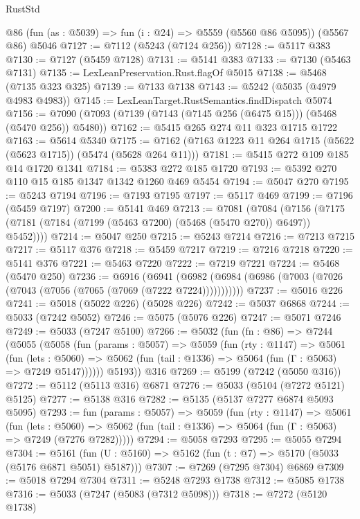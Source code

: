 \begin{lexlean}{RustStd}
\begin{coremodule}
{\begin{coremodule}
{{{{{{{{{{{{{{{{{{{{{{{{{{{{{{{{{{    @86
    (fun (as : @5039) => fun (i : @24) => @5559 (@5560 @86 @5095))
    (@5567 @86)
    @5046
@7127 := @7112 (@5243 (@7124 @256))
@7128 := @5117 @383
@7130 := @7127 (@5459 @7128)
@7131 := @5141 @383
@7133 := @7130 (@5463 @7131)
@7135 := LexLeanPreservation.Rust.flagOf @5015
@7138 := @5468 (@7135 @323 @325)
@7139 := @7133 @7138
@7143 := @5242 (@5035 (@4979 @4983 @4983))
@7145 := LexLeanTarget.RustSemantics.findDispatch @5074
@7156 := @7090 (@7093 (@7139 (@7143 (@7145 @256 (@6475 @15))) (@5468 (@5470 @256)) @5480))
@7162 := @5415 @265 @274 @11 @323 @1715 @1722
@7163 := @5614 @5340
@7175 := @7162 (@7163 @1223 @11 @264 @1715 (@5622 (@5623 @1715)) (@5474 (@5628 @264 @11)))
@7181 := @5415 @272 @109 @185 @14 @1720 @1341
@7184 := @5383 @272 @185 @1720
@7193 := @5392 @270 @110 @15 @185 @1347 @1342 @1260 @469 @5454
@7194 := @5047 @270
@7195 := @5243 @7194
@7196 := @7193 @7195
@7197 := @5117 @469
@7199 := @7196 (@5459 @7197)
@7200 := @5141 @469
@7213 := @7081
    (@7084 (@7156 (@7175 (@7181 (@7184 (@7199 (@5463 @7200) (@5468 (@5470 @270)) @6497)) @5452))))
@7214 := @5047 @250
@7215 := @5243 @7214
@7216 := @7213 @7215
@7217 := @5117 @376
@7218 := @5459 @7217
@7219 := @7216 @7218
@7220 := @5141 @376
@7221 := @5463 @7220
@7222 := @7219 @7221
@7224 := @5468 (@5470 @250)
@7236 := @6916
    (@6941 (@6982 (@6984 (@6986 (@7003 (@7026 (@7043 (@7056 (@7065 (@7069 (@7222 @7224)))))))))))
@7237 := @5016 @226
@7241 := @5018 (@5022 @226) (@5028 @226)
@7242 := @5037 @6868
@7244 := @5033 (@7242 @5052)
@7246 := @5075 (@5076 @226)
@7247 := @5071 @7246
@7249 := @5033 (@7247 @5100)
@7266 := @5032
    (fun (fn : @86) =>
    @7244
      (@5055
        (@5058
          (fun (params : @5057) =>
          @5059
            (fun (rty : @1147) =>
            @5061
              (fun (lets : @5060) =>
              @5062 (fun (tail : @1336) => @5064 (fun (Γ : @5063) => @7249 @5147))))))
        @5193))
    @316
@7269 := @5199 (@7242 (@5050 @316))
@7272 := @5112 (@5113 @316) @6871
@7276 := @5033 (@5104 (@7272 @5121) @5125)
@7277 := @5138 @316
@7282 := @5135 (@5137 @7277 @6874 @5093 @5095)
@7293 := fun (params : @5057) =>
  @5059
    (fun (rty : @1147) =>
    @5061
      (fun (lets : @5060) =>
      @5062 (fun (tail : @1336) => @5064 (fun (Γ : @5063) => @7249 (@7276 @7282)))))
@7294 := @5058 @7293
@7295 := @5055 @7294
@7304 := @5161 (fun (U : @5160) => @5162 (fun (t : @7) => @5170 (@5033 (@5176 @6871 @5051) @5187)))
@7307 := @7269 (@7295 @7304) @6869
@7309 := @5018 @7294 @7304
@7311 := @5248 @7293 @1738
@7312 := @5085 @1738
@7316 := @5033 (@7247 (@5083 (@7312 @5098)))
@7318 := @7272 (@5120 @1738)
}}}}}}}}}}}}}}}}}}}}}}}}}}}}}}}}}}
\end{coremodule}}
\end{coremodule}
\end{lexlean}
